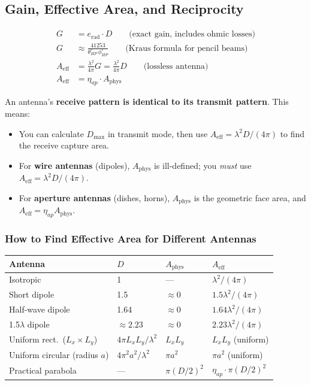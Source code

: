 \documentclass[10pt,letterpaper]{article}
\newcommand{\Aeff}{A_{\mathrm{eff}}}
\newcommand{\Aphys}{A_{\mathrm{phys}}}
\begin{document}
\subsection{Gain, Effective Area, and Reciprocity}

\begin{tcolorbox}[formulabox, title={Gain \& Effective Area}]
\begin{align}
  G &= e_\mathrm{rad}\cdot D \qquad \text{(exact gain, includes ohmic losses)} \\
  G &\approx \frac{41253}{\theta_{HP}^\circ\,\phi_{HP}^\circ} \qquad \text{(Kraus formula for pencil beams)} \\[4pt]
  \Aeff &= \frac{\lambda^2}{4\pi}G = \frac{\lambda^2}{4\pi}D \qquad \text{(lossless antenna)} \\
  \Aeff &= \eta_{ap}\cdot\Aphys
\end{align}
\end{tcolorbox}

\begin{tcolorbox}[keybox, title={Reciprocity Theorem}]
An antenna's \textbf{receive pattern is identical to its transmit pattern}. This means:
\begin{itemize}[noitemsep]
  \item You can calculate $D_\mathrm{max}$ in transmit mode, then use $\Aeff = \lambda^2 D/(4\pi)$ to find the receive capture area.
  \item For \textbf{wire antennas} (dipoles), $\Aphys$ is ill-defined; you \emph{must} use $\Aeff = \lambda^2 D/(4\pi)$.
  \item For \textbf{aperture antennas} (dishes, horns), $\Aphys$ is the geometric face area, and $\Aeff = \eta_{ap}\Aphys$.
\end{itemize}
\end{tcolorbox}

\subsubsection{How to Find Effective Area for Different Antennas}

\begin{center}
\begin{tabular}{llll}
\toprule
\textbf{Antenna} & \textbf{$D$} & \textbf{$\Aphys$} & \textbf{$\Aeff$} \\
\midrule
Isotropic & 1 & --- & $\lambda^2/(4\pi)$ \\
Short dipole & 1.5 & $\approx 0$ & $1.5\lambda^2/(4\pi)$ \\
Half-wave dipole & 1.64 & $\approx 0$ & $1.64\lambda^2/(4\pi)$ \\
1.5$\lambda$ dipole & $\approx 2.23$ & $\approx 0$ & $2.23\lambda^2/(4\pi)$ \\
Uniform rect.\ ($L_x\times L_y$) & $4\pi L_xL_y/\lambda^2$ & $L_x L_y$ & $L_x L_y$ (uniform) \\
Uniform circular (radius $a$) & $4\pi^2 a^2/\lambda^2$ & $\pi a^2$ & $\pi a^2$ (uniform) \\
Practical parabola & --- & $\pi(D/2)^2$ & $\eta_{ap}\cdot\pi(D/2)^2$ \\
\bottomrule
\end{tabular}
\end{center}
\end{document}
